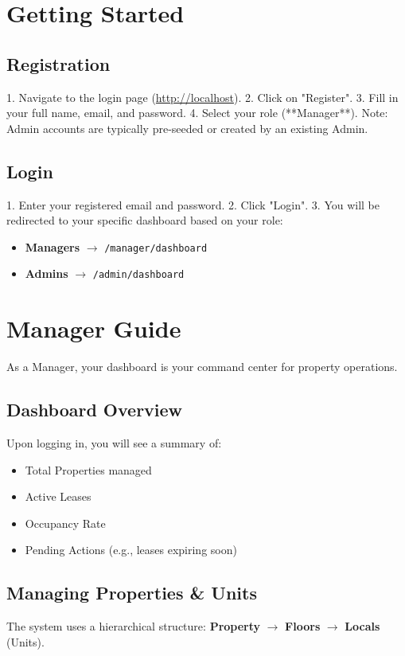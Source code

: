 \documentclass[12pt,a4paper]{article}
\begin{document}
\section{Getting Started}

\subsection{Registration}
1. Navigate to the login page (\url{http://localhost}).
2. Click on "Register".
3. Fill in your full name, email, and password.
4. Select your role (**Manager**). Note: Admin accounts are typically pre-seeded or created by an existing Admin.

\subsection{Login}
1. Enter your registered email and password.
2. Click "Login".
3. You will be redirected to your specific dashboard based on your role:
   \begin{itemize}
       \item \textbf{Managers} $\rightarrow$ \texttt{/manager/dashboard}
       \item \textbf{Admins} $\rightarrow$ \texttt{/admin/dashboard}
   \end{itemize}

\section{Manager Guide}
As a Manager, your dashboard is your command center for property operations.

\subsection{Dashboard Overview}
Upon logging in, you will see a summary of:
\begin{itemize}
    \item Total Properties managed
    \item Active Leases
    \item Occupancy Rate
    \item Pending Actions (e.g., leases expiring soon)
\end{itemize}

\subsection{Managing Properties \& Units}
The system uses a hierarchical structure: \textbf{Property} $\rightarrow$ \textbf{Floors} $\rightarrow$ \textbf{Locals} (Units).
\end{document}
